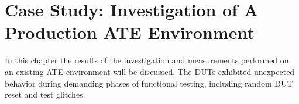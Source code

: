 
\chapter{Case Study: Investigation of A Production \acs{ATE} Environment}
\label{ch:casestudy-from-ate-to-dut}

In this chapter the results of the investigation and measurements performed on an
existing \ac{ATE} environment will be discussed.
The \acp{DUT} exhibited unexpected behavior during demanding phases of
functional testing, including random \ac{DUT} reset and test
glitches.






